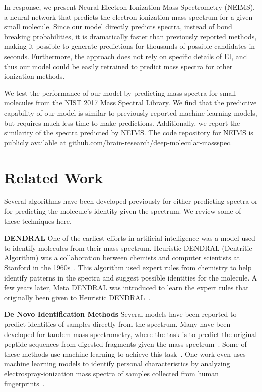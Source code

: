 \documentclass{article}
\begin{document}
In response, we present Neural Electron Ionization Mass Spectrometry (NEIMS), a neural network that predicts the electron-ionization mass spectrum for a given small molecule. Since our model directly predicts spectra, instead of bond breaking probabilities, it is dramatically faster than previously reported methods, making it possible to generate predictions for thousands of possible candidates in seconds. Furthermore, the approach does not rely on specific details of EI, and thus our model could be easily retrained to predict mass spectra for other ionization methods.

We test the performance of our model by predicting mass spectra for small molecules from the NIST 2017 Mass Spectral Library. We find that the predictive capability of our model is similar to previously reported machine learning models, but requires much less time to make predictions. Additionally, we report the similarity of the spectra predicted by NEIMS. The code repository for NEIMS is publicly available at github.com/brain-research/deep-molecular-massspec.

\section{Related Work}
\label{sec:related-work}
Several algorithms have been developed previously for either predicting spectra or for predicting the molecule's identity given the spectrum. We review some of these techniques here.

\textbf{DENDRAL} One of the earliest efforts in artificial intelligence was a model used to identify molecules from their mass spectrum. Heuristic DENDRAL (Dentritic Algorithm) was a collaboration between chemists and computer scientists at Stanford in the 1960s~\cite{buchanan1981dendral}. This algorithm used expert rules from chemistry to help identify patterns in the spectra and suggest possible identities for the molecule. A few years later, Meta DENDRAL was introduced to learn the expert rules that originally been given to Heuristic DENDRAL~\cite{lindsay1993dendral}.
    
\textbf{De Novo Identification Methods} Several models have been reported to predict identities of samples directly from the spectrum. Many have been developed for tandem mass spectrometry, where the task is to predict the original peptide sequences from digested fragments given the mass spectrum~\cite{Eng1994sequest}. Some of these methods use machine learning to achieve this task~\cite{Tran8247deepnovo, Schoenholtz2018supervision}. One work even uses machine learning models to identify personal characteristics by analyzing electrospray-ionization mass spectra of samples collected from human fingerprints~\cite{Zhou2017LatentFingerprints}.
    
\end{document}
